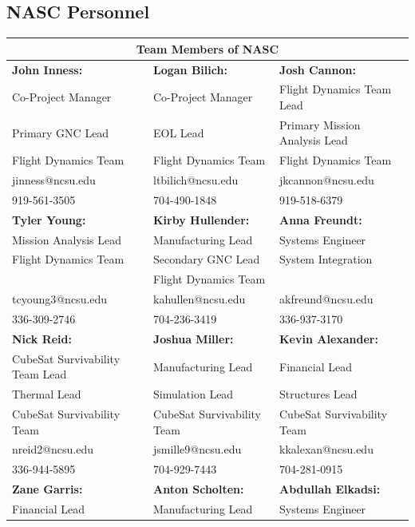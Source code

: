 \subsection{NASC Personnel}
%
\begin{center}
\begin{tabular}{|p{5.3cm}||p{5.3cm}||p{5.3cm}|}
\hline
 \multicolumn{3}{|c|}{Team Members of NASC} \\
 \hline %
 \textbf{John Inness:}&  \textbf{Logan Bilich: }& \textbf{Josh Cannon: }\\ 
 Co-Project Manager   & Co-Project Manager & Flight Dynamics Team Lead   \\
 Primary GNC Lead & EOL Lead & Primary Mission Analysis Lead \\
 Flight Dynamics Team  & Flight Dynamics Team  & Flight Dynamics Team  \\
 jinness@ncsu.edu   & ltbilich@ncsu.edu   & jkcannon@ncsu.edu \\
 919-561-3505  & 704-490-1848 & 919-518-6379 \\
\hline %
 \textbf{Tyler Young: } &  \textbf{Kirby Hullender:} & \textbf{Anna Freundt:}\\ 
  Mission Analysis Lead  & Manufacturing Lead & Systems Engineer   \\
Flight Dynamics Team  & Secondary GNC Lead & System Integration \\
 & Flight Dynamics Team &  \\
 tcyoung3@ncsu.edu   & kahullen@ncsu.edu & akfreund@ncsu.edu  \\
 336-309-2746  & 704-236-3419  & 336-937-3170\\
 \hline %
 \textbf{Nick Reid: }&  \textbf{Joshua Miller: }& \textbf{Kevin Alexander: }\\ 
 CubeSat Survivability Team Lead   & Manufacturing Lead & Financial Lead   \\
 Thermal Lead & Simulation Lead & Structures Lead \\
 CubeSat Survivability Team  & CubeSat Survivability Team  & CubeSat Survivability Team  \\
 nreid2@ncsu.edu    & jsmille9@ncsu.edu  & kkalexan@ncsu.edu  \\
 336-944-5895   & 704-929-7443  & 704-281-0915 \\
 \hline %
 \textbf{Zane Garris: }&  \textbf{Anton Scholten: }& \textbf{Abdullah Elkadsi:}\\ 
 Financial Lead   & Manufacturing Lead & Systems Engineer    \\

\end{tabular}
\end{center}
